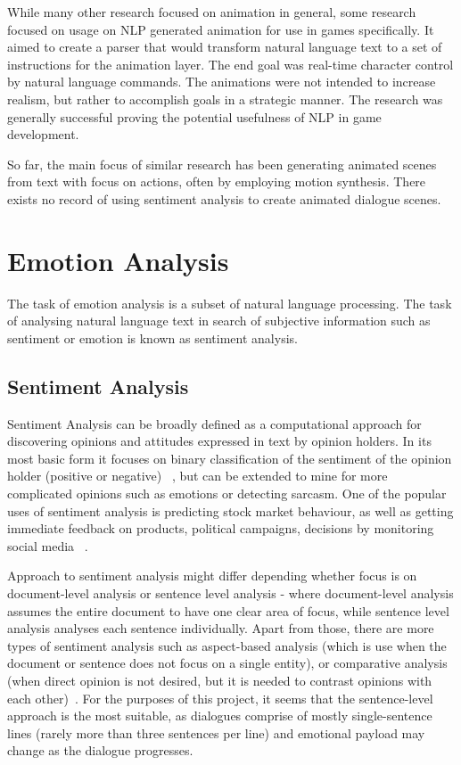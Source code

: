 While many other research focused on animation in general, some research focused on usage on NLP generated animation for use in games specifically. It aimed to create a parser that would transform natural language text to a set of instructions for the animation layer. The end goal was real-time character control by natural language commands. The animations were not intended to increase realism, but rather to accomplish goals in a strategic manner. The research was generally successful proving the potential usefulness of NLP in game development. ~\cite{animpaper3}

So far, the main focus of similar research has been generating animated scenes from text with focus on actions, often by employing motion synthesis. There exists no record of using  sentiment analysis to create animated dialogue scenes.




\section{Emotion Analysis}

The task of emotion analysis is a subset of natural language processing. The task of analysing natural language text in search of subjective information such as sentiment or emotion is known as sentiment analysis.

\subsection{Sentiment Analysis}
Sentiment Analysis can be broadly defined as a computational approach for discovering opinions and attitudes expressed in text by opinion holders. In its most basic form it focuses on binary classification of the sentiment of the opinion holder (positive or negative) ~\cite{sentimentanal1}, but can be extended to mine for more complicated opinions such as emotions or detecting sarcasm. One of the popular uses of sentiment analysis is predicting stock market behaviour, as well as getting immediate feedback on products, political campaigns, decisions by monitoring social media ~\cite{sentimentanal2}.

Approach to sentiment analysis might differ depending whether focus is on document-level analysis or sentence level analysis - where document-level analysis assumes the entire document to have one clear area of focus, while sentence level analysis analyses each sentence individually. Apart from those, there are more types of sentiment analysis such as aspect-based analysis (which is use when the document or sentence does not focus on a single entity), or comparative analysis (when direct opinion is not desired, but it is needed to contrast opinions with each other)~\cite{sentimentanal2}. For the purposes of this project, it seems that the sentence-level approach is the most suitable, as dialogues comprise of mostly single-sentence lines (rarely more than three sentences per line) and emotional payload may change as the dialogue progresses.

